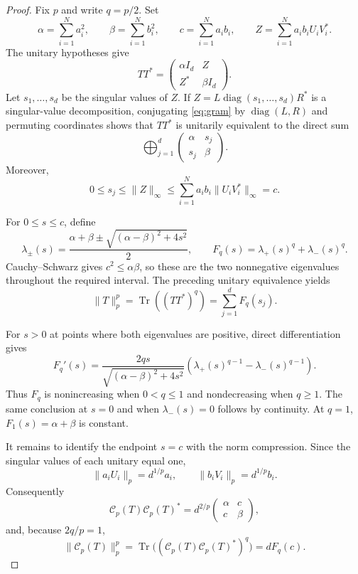 \documentclass[11pt]{article}
\newcommand{\Tr}{\operatorname{Tr}}
\newcommand{\diag}{\operatorname{diag}}
\newcommand{\Cp}{\mathcal C_p}
\begin{document}
\begin{proof}
Fix $p$ and write $q=p/2$.  Set
\[
 \alpha=\sum_{i=1}^N a_i^2,\qquad
 \beta=\sum_{i=1}^N b_i^2,\qquad
 c=\sum_{i=1}^N a_ib_i,
 \qquad
 Z=\sum_{i=1}^N a_ib_iU_iV_i^*.
\]
The unitary hypotheses give
\begin{equation}
 TT^*=\begin{pmatrix}
 \alpha I_d&Z\\ Z^*&\beta I_d
 \end{pmatrix}.                                      \label{eq:gram}
\end{equation}
Let $s_1,\ldots,s_d$ be the singular values of $Z$.  If
$Z=L\diag(s_1,\ldots,s_d)R^*$ is a singular-value decomposition, conjugating
\eqref{eq:gram} by $\diag(L,R)$ and permuting coordinates shows that $TT^*$
is unitarily equivalent to the direct sum
\[
 \bigoplus_{j=1}^d
 \begin{pmatrix}\alpha&s_j\\s_j&\beta\end{pmatrix}.
\]
Moreover,
\begin{equation}
 0\leq s_j\leq\lVert Z\rVert_\infty
 \leq\sum_{i=1}^N a_ib_i\lVert U_iV_i^*\rVert_\infty=c.       \label{eq:sbound}
\end{equation}

For $0\leq s\leq c$, define
\[
 \lambda_\pm(s)=\frac{\alpha+\beta
 \pm\sqrt{(\alpha-\beta)^2+4s^2}}{2},
 \qquad
 F_q(s)=\lambda_+(s)^q+\lambda_-(s)^q.
\]
Cauchy--Schwarz gives $c^2\leq\alpha\beta$, so these are the two
nonnegative eigenvalues throughout the required interval.  The preceding
unitary equivalence yields
\begin{equation}
 \lVert T\rVert_p^p=\Tr((TT^*)^q)=\sum_{j=1}^dF_q(s_j).       \label{eq:full}
\end{equation}

For $s>0$ at points where both eigenvalues are positive, direct
differentiation gives
\begin{equation}
 F_q'(s)=
 \frac{2qs}{\sqrt{(\alpha-\beta)^2+4s^2}}
 \left(\lambda_+(s)^{q-1}-\lambda_-(s)^{q-1}\right).        \label{eq:derivative}
\end{equation}
Thus $F_q$ is nonincreasing when $0<q\leq1$ and nondecreasing when $q\geq1$.
The same conclusion at $s=0$ and when $\lambda_-(s)=0$ follows by continuity.
At $q=1$, $F_1(s)=\alpha+\beta$ is constant.

It remains to identify the endpoint $s=c$ with the norm compression.  Since
the singular values of each unitary equal one,
\[
 \lVert a_iU_i\rVert_p=d^{1/p}a_i,
 \qquad
 \lVert b_iV_i\rVert_p=d^{1/p}b_i.
\]
Consequently
\[
 \Cp(T)\Cp(T)^*=d^{2/p}
 \begin{pmatrix}\alpha&c\\c&\beta\end{pmatrix},
\]
and, because $2q/p=1$,
\begin{equation}
 \lVert\Cp(T)\rVert_p^p
 =\Tr\bigl((\Cp(T)\Cp(T)^*)^q\bigr)
 =dF_q(c).                                                \label{eq:compressed}
\end{equation}


\end{proof}
\end{document}
